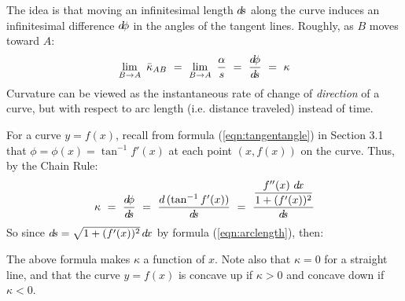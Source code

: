 
\noindent The idea is that moving an infinitesimal length $d\!s$ along the curve
induces an infinitesimal difference $d\!\phi$ in the angles of the tangent lines.
Roughly, as $B$ moves toward $A$:
\[
\lim_{B \to A}~\bar{\kappa}_{AB} ~=~ \lim_{B \to A}~ \frac{\alpha}{s} ~=~
\frac{d\!\phi}{d\!s} ~=~ \kappa
\]
Curvature can be viewed as the instantaneous rate of change of \emph{direction}
of a curve, but with respect to arc length (i.e. distance traveled) instead of
time.

For a curve $y=f(x)$, recall from formula (\ref{eqn:tangentangle}) in Section
3.1 that $\phi = \phi(x) = \tan^{-1} f'(x)$ at each point
$(x,f(x))$ on the curve. Thus, by the Chain Rule:
\[
\kappa ~=~ \frac{d\!\phi}{d\!s} ~=~ \frac{d\,(\tan^{-1} f'(x))}{d\!s} ~=~
\frac{\dfrac{f''(x)~d\!x}{1 + (f'(x))^2}}{d\!s}
\]
So since $d\!s=\sqrt{1 + (f'(x))^2}\,d\!x$ by formula (\ref{eqn:arclength}), then:


\noindent The above formula makes $\kappa$ a function of $x$. Note also that
$\kappa=0$ for a straight line, and that the curve $y=f(x)$  is concave up if
$\kappa > 0$ and concave down if $\kappa < 0$. 

